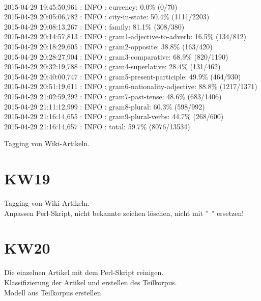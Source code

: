 \documentclass[11pt,a4paper]{article}
\begin{document}
\\2015-04-29 19:45:50,961 : INFO : currency: 0.0\% (0/70)
\\2015-04-29 20:05:06,782 : INFO : city-in-state: 50.4\% (1111/2203)
\\2015-04-29 20:08:13,267 : INFO : family: 81.1\% (308/380)
\\2015-04-29 20:14:57,813 : INFO : gram1-adjective-to-adverb: 16.5\% (134/812)
\\2015-04-29 20:18:29,605 : INFO : gram2-opposite: 38.8\% (163/420)
\\2015-04-29 20:28:27,904 : INFO : gram3-comparative: 68.9\% (820/1190)
\\2015-04-29 20:32:19,788 : INFO : gram4-superlative: 28.4\% (131/462)
\\2015-04-29 20:40:00,747 : INFO : gram5-present-participle: 49.9\% (464/930)
\\2015-04-29 20:51:19,611 : INFO : gram6-nationality-adjective: 88.8\% (1217/1371)
\\2015-04-29 21:02:59,292 : INFO : gram7-past-tense: 48.6\% (683/1406)
\\2015-04-29 21:11:12,999 : INFO : gram8-plural: 60.3\% (598/992)
\\2015-04-29 21:16:14,655 : INFO : gram9-plural-verbs: 44.7\% (268/600)
\\2015-04-29 21:16:14,657 : INFO : total: 59.7\% (8076/13534)


Tagging von Wiki-Artikeln.
\section*{KW19}
Tagging von Wiki-Artikeln.
\\Anpassen Perl-Skript, nicht bekannte zeichen löschen, nicht mit '' '' ersetzen!

\section*{KW20}
Die einzelnen Artikel mit dem Perl-Skript reinigen.
\\Klassifizierung der Artikel und erstellen des Teilkorpus.
\\Modell aus Teilkorpus erstellen.
\end{document}
